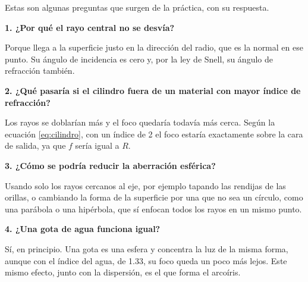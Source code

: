 Estas son algunas preguntas que surgen de la práctica, con su respuesta.

\textbf{1. ¿Por qué el rayo central no se desvía?}

Porque llega a la superficie justo en la dirección del radio, que es la normal en ese punto. Su ángulo de incidencia es cero y, por la ley de Snell, su ángulo de refracción también.

\textbf{2. ¿Qué pasaría si el cilindro fuera de un material con mayor índice de refracción?}

Los rayos se doblarían más y el foco quedaría todavía más cerca. Según la ecuación \eqref{eq:cilindro}, con un índice de 2 el foco estaría exactamente sobre la cara de salida, ya que $f$ sería igual a $R$.

\textbf{3. ¿Cómo se podría reducir la aberración esférica?}

Usando solo los rayos cercanos al eje, por ejemplo tapando las rendijas de las orillas, o cambiando la forma de la superficie por una que no sea un círculo, como una parábola o una hipérbola, que sí enfocan todos los rayos en un mismo punto.

\textbf{4. ¿Una gota de agua funciona igual?}

Sí, en principio. Una gota es una esfera y concentra la luz de la misma forma, aunque con el índice del agua, de 1.33, su foco queda un poco más lejos. Este mismo efecto, junto con la dispersión, es el que forma el arcoíris.
